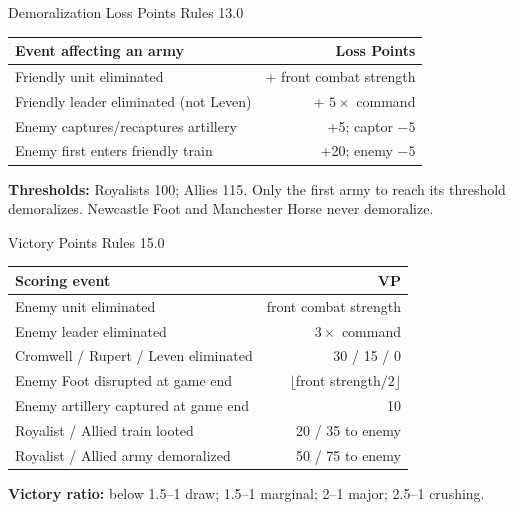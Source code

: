 \vspace{3pt}
\begin{minipage}[t]{.49\textwidth}\vspace{0pt}
\begin{aidbox}{Demoralization Loss Points \hfill \normalfont\small Rules 13.0}
\fontsize{7.8}{8.8}\selectfont
\begin{tabularx}{\linewidth}{@{}Xr@{}}
  \toprule
  \textbf{Event affecting an army} & \textbf{Loss Points} \\
  \midrule
  Friendly unit eliminated & + front combat strength \\
  Friendly leader eliminated (not Leven) & + $5\times$ command \\
  Enemy captures/recaptures artillery & +5; captor $-5$ \\
  Enemy first enters friendly train & +20; enemy $-5$ \\
  \bottomrule
\end{tabularx}
\smallskip
\textbf{Thresholds:} Royalists 100; Allies 115. Only the first army to reach its threshold demoralizes. Newcastle Foot and Manchester Horse never demoralize.
\end{aidbox}
\end{minipage}\hfill
\begin{minipage}[t]{.49\textwidth}\vspace{0pt}
\begin{aidbox}{Victory Points \hfill \normalfont\small Rules 15.0}
\fontsize{7.8}{8.8}\selectfont
\begin{tabularx}{\linewidth}{@{}Xr@{}}
  \toprule
  \textbf{Scoring event} & \textbf{VP} \\
  \midrule
  Enemy unit eliminated & front combat strength \\
  Enemy leader eliminated & $3\times$ command \\
  Cromwell / Rupert / Leven eliminated & 30 / 15 / 0 \\
  Enemy Foot disrupted at game end & $\lfloor$front strength$/2\rfloor$ \\
  Enemy artillery captured at game end & 10 \\
  Royalist / Allied train looted & 20 / 35 to enemy \\
  Royalist / Allied army demoralized & 50 / 75 to enemy \\
  \bottomrule
\end{tabularx}
\smallskip
\textbf{Victory ratio:} below 1.5--1 draw; 1.5--1 marginal; 2--1 major; 2.5--1 crushing.
\end{aidbox}
\end{minipage}
